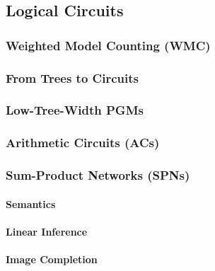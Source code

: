 		\subsection{Logical Circuits} %

			\subsubsection{Weighted Model Counting (WMC)} %

			\subsubsection{From Trees to Circuits} %

			\subsubsection{Low-Tree-Width PGMs} %

			\subsubsection{Arithmetic Circuits (ACs)} %

			\subsubsection{Sum-Product Networks (SPNs)} %

				\paragraph{Semantics} %

				\paragraph{Linear Inference} %

				\paragraph{Image Completion} %

